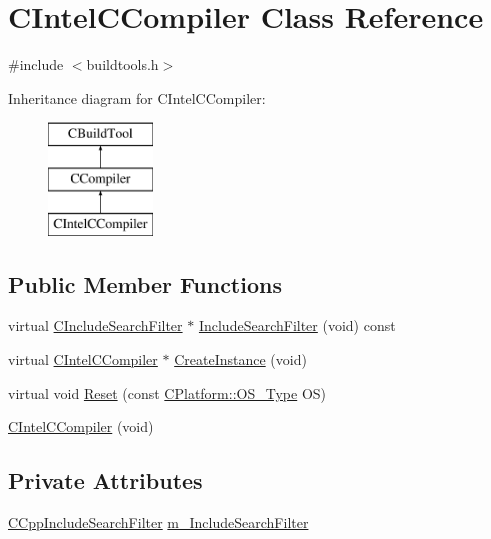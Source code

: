 \hypertarget{classCIntelCCompiler}{\section{C\-Intel\-C\-Compiler Class Reference}
\label{classCIntelCCompiler}
}


{\ttfamily \#include $<$buildtools.\-h$>$}

Inheritance diagram for C\-Intel\-C\-Compiler\-:\begin{figure}[H]
\begin{center}
\leavevmode
\includegraphics[height=3.000000cm]{d1/d74/classCIntelCCompiler}
\end{center}
\end{figure}
\subsection*{Public Member Functions}
\begin{DoxyCompactItemize}
\item 
virtual \hyperlink{classCIncludeSearchFilter}{C\-Include\-Search\-Filter} $\ast$ \hyperlink{classCIntelCCompiler_a1864ae37aea1eecddfcec8ab456dc8a3}{Include\-Search\-Filter} (void) const 
\item 
virtual \hyperlink{classCIntelCCompiler}{C\-Intel\-C\-Compiler} $\ast$ \hyperlink{classCIntelCCompiler_a4f259da4011feabc53b1ebf9a26bd2de}{Create\-Instance} (void)
\item 
virtual void \hyperlink{classCIntelCCompiler_af5d140834df595d4b5e370e534acb933}{Reset} (const \hyperlink{classCPlatform_a2fb735c63c53052f79629e338bb0f535}{C\-Platform\-::\-O\-S\-\_\-\-Type} O\-S)
\item 
\hyperlink{classCIntelCCompiler_a5cc83d2a7e47dfe79bd132d616f950b7}{C\-Intel\-C\-Compiler} (void)
\end{DoxyCompactItemize}
\subsection*{Private Attributes}
\begin{DoxyCompactItemize}
\item 
\hyperlink{classCCppIncludeSearchFilter}{C\-Cpp\-Include\-Search\-Filter} \hyperlink{classCIntelCCompiler_a8c22765da736a3390cf467c94a86939c}{m\-\_\-\-Include\-Search\-Filter}
\end{DoxyCompactItemize}
